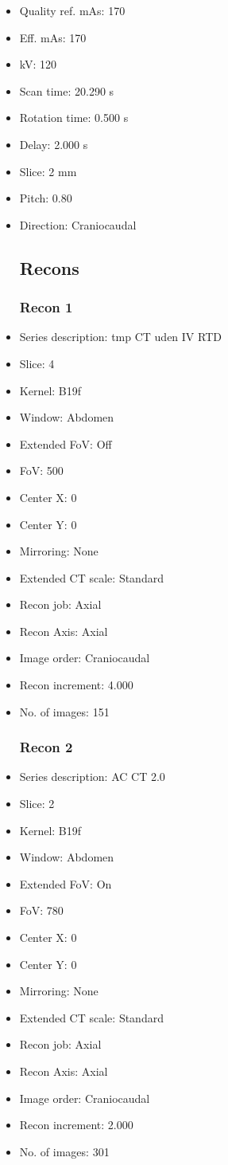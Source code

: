 \documentclass[12pt]{article}
\begin{document}
\begin{itemize}
\subsection{Scan}
\item Quality ref. mAs: 170\item Eff. mAs: 170\item kV: 120\item Scan time: 20.290 s\item Rotation time: 0.500 s\item Delay: 2.000 s\item Slice: 2 mm\item Pitch: 0.80\item Direction: Craniocaudal\subsection{Recons}

\subsubsection{Recon 1}
\item Series description: tmp CT uden IV RTD
\item Slice: 4
\item Kernel: B19f
\item Window: Abdomen
\item Extended FoV: Off
\item FoV: 500
\item Center X: 0
\item Center Y: 0
\item Mirroring: None
\item Extended CT scale: Standard
\item Recon job: Axial
\item Recon Axis: Axial
\item Image order: Craniocaudal
\item Recon increment: 4.000
\item No. of images: 151
\subsubsection{Recon 2}
\item Series description: AC CT  2.0
\item Slice: 2
\item Kernel: B19f
\item Window: Abdomen
\item Extended FoV: On
\item FoV: 780
\item Center X: 0
\item Center Y: 0
\item Mirroring: None
\item Extended CT scale: Standard
\item Recon job: Axial
\item Recon Axis: Axial
\item Image order: Craniocaudal
\item Recon increment: 2.000
\item No. of images: 301

\end{itemize}
\end{document}
